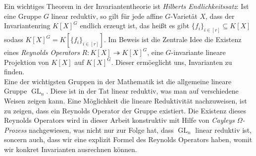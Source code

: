 Ein wichtiges Theorem in der Invariantentheorie ist \textit{Hilberts Endlichkeitssatz}:  Ist eine Gruppe $G$ linear reduktiv, so gilt f\"ur jede affine $G$-Variet\"at $X$, dass der Invariantenring $K[X]^G$ endlich erzeugt ist, das hei{\ss}t es gibt $\{f_i\}_{i\in[r]} \subseteq K[X]$ sodass $K[X]^G = K[\{f_i\}_{i\in[r]}]$.
Im Beweis ist die Zentrale Idee die Existenz eines \textit{Reynolds Operators} $R \colon K[X] \twoheadrightarrow K[X]^G$, eine $G$-invariante lineare Projektion von $K[X]$ auf $K[X]^G$.
Dieser erm\"oeglicht uns, Invarianten zu finden.  \\
Eine der wichtigsten Gruppen in der Mathematik ist die allgemeine lineare Gruppe $\operatorname{GL}_n$.
Diese ist in der Tat linear reduktiv, was man auf verschiedene Weisen zeigen kann.
Eine M\"oglichkeit die lineare Reduktivit\"at nachzuweisen, ist zu zeigen, dass ein Reynolds Operator der Gruppe existiert.
Die Existenz dieses Reynolds Operators wird in dieser Arbeit konstruktiv mit Hilfe von \textit{Cayleys $\Omega$-Prozess} nachgewiesen, was nicht nur zur Folge hat, dass $\operatorname{GL}_n$ linear reduktiv ist, soncern auch, dass wir eine explizit Formel des Reynolds Operators haben, womit wir konkret Invarianten ausrechnen k\"onnen.
